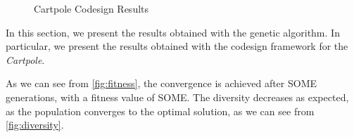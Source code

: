 \begin{figure}[h]
    \centering
    \caption{Cartpole Codesign Results}
\end{figure}

In this section, we present the results obtained with the genetic algorithm. In particular, we present the results obtained with the codesign
framework for the \textit{Cartpole}.

As we can see from \cref{fig:fitness}, the convergence is achieved after SOME generations, with a fitness value of SOME. The diversity decreases as expected, as the population converges to the optimal solution, as we can see from \cref{fig:diversity}.